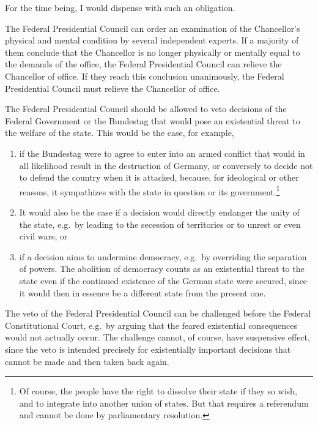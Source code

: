 For the time being, I would dispense with such an obligation.

\label{subsubsubsec:removal_for_health}
The Federal Presidential Council can order an examination of the Chancellor's physical and mental condition by several independent experts.
If a majority of them conclude that the Chancellor is no longer physically or mentally equal to the demands of the office, the Federal Presidential Council can
relieve the Chancellor of office.
If they reach this conclusion unanimously, the Federal Presidential Council must relieve the Chancellor of office.

\label{subsubsubsec:veto_rights}
The Federal Presidential Council should be allowed to veto decisions of the Federal Government or the Bundestag that would pose an existential threat to the welfare of the state.
This would be the case, for example,
\begin{enumerate}[label=\alph*)]
    \item if the Bundestag were to agree to enter into an armed conflict that would in all likelihood result in the destruction of Germany, or conversely to decide not to defend the country when it is attacked, because, for ideological or other reasons, it sympathizes with the state in question or its government.\footnote{Of course, the people have the right to dissolve their state if they so wish, and to integrate into another union of states.
      But that requires a referendum and cannot be done by parliamentary resolution.}
    \item It would also be the case if a decision would directly endanger the unity of the state, e.g.\ by leading to the secession of territories or to unrest or even civil wars, or
    \item if a decision aims to undermine democracy, e.g.\ by overriding the separation of powers.
     The abolition of democracy counts as an existential threat to the state even if the continued existence of the German state were secured, since it would then in essence be a different state from the present one.
\end{enumerate}

The veto of the Federal Presidential Council can be challenged before the Federal Constitutional Court, e.g.\ by arguing that the feared existential consequences would not actually occur.
The challenge cannot, of course, have suspensive effect, since the veto is intended precisely for existentially important decisions that cannot be made and then taken back again.

